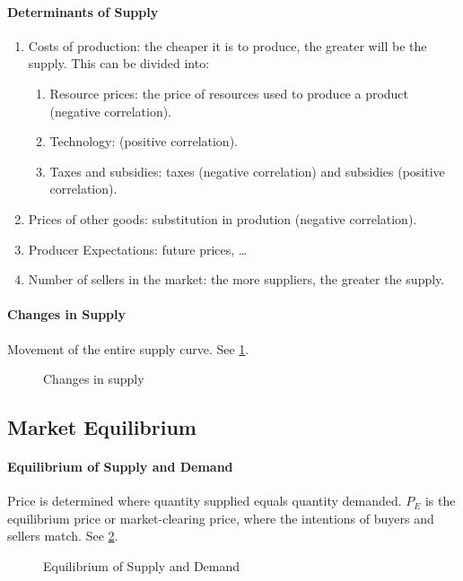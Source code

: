 \paragraph{Determinants of Supply}
\begin{enumerate}[label = \textbullet]
	\item Costs of production: the cheaper it is to produce, the greater will be the supply. This can be divided into:
		\begin{enumerate}[label = ---]
			\item Resource prices: the price of resources used to produce a product (negative correlation).
			\item Technology: (positive correlation).
			\item Taxes and subsidies: taxes (negative correlation) and subsidies (positive correlation).
		\end{enumerate}
	\item Prices of other goods: substitution in prodution (negative correlation).
	\item Producer Expectations: future prices, \dots
	\item Number of sellers in the market: the more suppliers, the greater the supply.
\end{enumerate}
\paragraph{Changes in Supply} Movement of the entire supply curve. See \cref{fig:changes_in_supply}.

\begin{figure}[ht]
	\centering
	\caption{Changes in supply}
	\label{fig:changes_in_supply}
\end{figure}

\subsection{Market Equilibrium}
\paragraph{Equilibrium of Supply and Demand} Price is determined where quantity supplied equals quantity demanded.
$P_E$ is the equilibrium price or market-clearing price, where the intentions of buyers and sellers match.
See \cref{fig:equilibrium_of_supply_and_demand}.

\begin{figure}[ht]
	\centering
	\caption{Equilibrium of Supply and Demand}
	\label{fig:equilibrium_of_supply_and_demand}
\end{figure}

